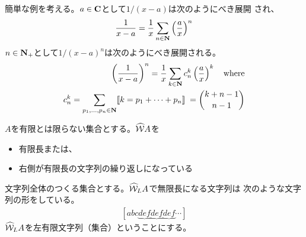 	簡単な例を考える。$a\in\mathbf{C}$として$1/(x-a)$は次のようにべき展開
	され、
	\begin{equation*}\begin{split}
		\frac{1}{x-a} = \frac{1}{x}\sum_{n\in\mathbf{N}}\left(\frac{a}{x}\right)^n
	\end{split}\end{equation*}
	$n\in\mathbf{N}_+$として$1/(x-a)^n$は次のようにべき展開される。
	\begin{equation*}\begin{split}
		\left(\frac{1}{x-a}\right)^n = \frac{1}{x}\sum_{k\in\mathbf{N}}
		c^k_n\left(\frac{a}{x}\right)^k \quad\text{where}\\
		c^k_n = \sum_{p_1,\dots,p_n\in\mathbf{N}}[\![k=p_1+\cdots+p_n]\!]\;
		= \binom{k+n-1}{n-1}
	\end{split}\end{equation*}

	\begin{todo}[ここまで]\label{todo:ここまで} %
	\end{todo} %

	\begin{definition}[周期的な無限長文字列その一]
	\label{def:周期的な無限長文字列その一} %
		$A$を有限とは限らない集合とする。$\widehat{{{\mathcal{W}}}} A$を
		\begin{itemize}\setlength{\itemsep}{-1mm} %
			\item 有限長または、
			\item 右側が有限長の文字列の繰り返しになっている
		\end{itemize} %
		文字列全体のつくる集合とする。$\widehat{{{\mathcal{W}}}}_LA$で無限長になる文字列は
		次のような文字列の形をしている。
		\begin{equation*}\begin{split}
			[abc\underbrace{def}\underbrace{def}\underbrace{def}\cdots]
		\end{split}\end{equation*}
		$\widehat{{{\mathcal{W}}}}_LA$を左有限文字列（集合）ということにする。
	\end{definition} %

